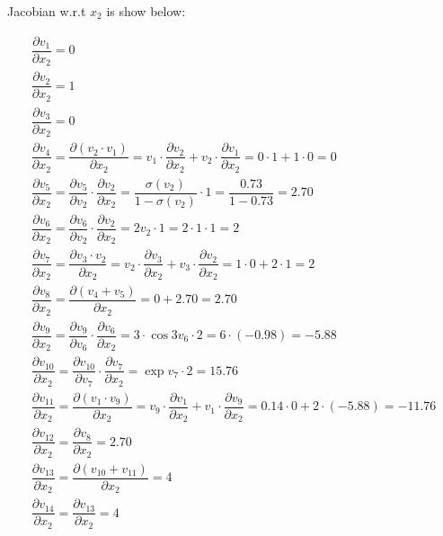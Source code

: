 \documentclass[12pt]{article}
\begin{document}
\begin{enumerate}[label=(\roman*)]
\newpage
Jacobian w.r.t $x_2$ is show below:\\
\begin{fleqn}
    \begin{gather*}
        \dfrac{\partial v_{1}}{\partial x_{2}} =  0 \\
        \dfrac{\partial v_{2}}{\partial x_{2}} =  1  \\
        \dfrac{\partial v_{3}}{\partial x_{2}} = 0  \\
        \dfrac{\partial v_{4}}{\partial x_{2}} = \dfrac{\partial (v_{2}\cdot v_1)}{\partial x_{2}} = v_1\cdot\dfrac{\partial v_{2}}{\partial x_{2}} + v_2\cdot\dfrac{\partial v_{1}}{\partial x_{2}} = 0\cdot 1 + 1\cdot 0 = 0   \\
        \dfrac{\partial v_{5}}{\partial x_{2}} = \dfrac{\partial v_{5}}{\partial v_{2}}\cdot \dfrac{\partial v_{2}}{\partial x_{2}} =  \dfrac{\sigma(v_2)}{1-\sigma(v_2)} \cdot 1 = \dfrac{0.73}{1-0.73} = 2.70  \\ 
        \dfrac{\partial v_{6}}{\partial x_{2}} = \dfrac{\partial v_{6}}{\partial v_{2}} \cdot \dfrac{\partial v_{2}}{\partial x_{2}} = 2 v_2 \cdot 1 = 2 \cdot 1 \cdot 1 = 2 \\
        \dfrac{\partial v_{7}}{\partial x_{2}} = \dfrac{\partial v_{3}\cdot v_2}{\partial x_{2}} = v_2 \cdot \dfrac{\partial v_{3}}{\partial x_{2}} + v_3 \cdot \dfrac{\partial v_{2}}{\partial x_{2}} = 1 \cdot 0 + 2 \cdot 1 = 2 \\ 
        \dfrac{\partial v_{8}}{\partial x_{2}} = \dfrac{\partial (v_{4} + v_5)}{\partial x_{2}} = 0 + 2.70 = 2.70  \\
        \dfrac{\partial v_{9}}{\partial x_{2}} = \dfrac{\partial v_{9}}{\partial v_{6}} \cdot \dfrac{\partial v_{6}}{\partial x_{2}} = 3 \cdot \cos{3v_6} \cdot 2 =  6 \cdot (-0.98) = -5.88  \\
        \dfrac{\partial v_{10}}{\partial x_{2}} = \dfrac{\partial v_{10}}{\partial v_{7}} \cdot \dfrac{\partial v_{7}}{\partial x_{2}}  = \exp{v_7} \cdot 2 = 15.76  \\
        \dfrac{\partial v_{11}}{\partial x_{2}} = \dfrac{\partial (v_{1}\cdot v_9)}{\partial x_{2}} = v_9\cdot\dfrac{\partial v_{1}}{\partial x_{2}} + v_1\cdot\dfrac{\partial v_{9}}{\partial x_{2}} = 0.14 \cdot 0 + 2\cdot (-5.88) = -11.76  \\
        \dfrac{\partial v_{12}}{\partial x_{2}} = \dfrac{\partial v_{8}}{\partial x_{2}} = 2.70  \\
        \dfrac{\partial v_{13}}{\partial x_{2}} = \dfrac{\partial (v_{10} + v_11)}{\partial x_{2}} = 4  \\
        \dfrac{\partial v_{14}}{\partial x_{2}} = \dfrac{\partial v_{13}}{\partial x_{2}}  = 4 \\
    \end{gather*}
\end{fleqn}


\end{enumerate}
\end{document}
